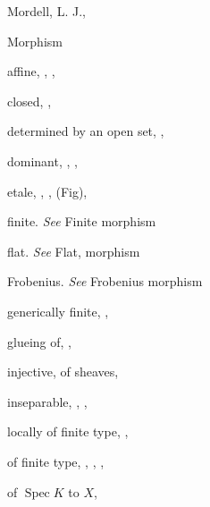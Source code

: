 {{\noindent\hspace*{0.0bp}Mordell, L. J., \par
\noindent\hspace*{0.0bp}Morphism\par
\noindent\hspace*{7.5bp}affine, , , \par
\noindent\hspace*{7.5bp}closed, , \par
\noindent\hspace*{7.5bp}determined by an open set, , \par
\noindent\hspace*{7.5bp}dominant, , , \par
\noindent\hspace*{7.5bp}etale, , ,  (Fig), \par
\noindent\hspace*{7.5bp}finite. \emph{See} Finite morphism\par
\noindent\hspace*{7.5bp}flat. \emph{See} Flat, morphism\par
\noindent\hspace*{7.5bp}Frobenius. \emph{See} Frobenius morphism\par
\noindent\hspace*{7.5bp}generically finite, , \par
\noindent\hspace*{7.5bp}glueing of, , \par
\noindent\hspace*{7.5bp}injective, of sheaves, \par
\noindent\hspace*{7.5bp}inseparable, , , \par
\noindent\hspace*{7.5bp}locally of finite type, , \par
\noindent\hspace*{7.5bp}of finite type, , , , \par
\noindent\hspace*{7.5bp}of $\operatorname{Spec}K$ to $X$, \par
}}
